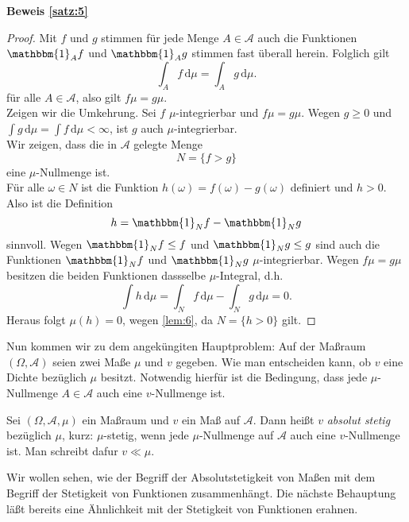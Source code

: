 \documentclass[/Users/zhangwusheng/Documents/satz von radon nikodym/satz von radon nikodym.tex]{subfiles}
\begin{document}
    \textbf{Beweis \cref{satz:5}}
    \begin{proof}
        Mit $f$ und $g$ stimmen für jede Menge $A \in \mathcal{A}$ auch die Funktionen 
        $\mathbbm{1}_{A} f$ und $\mathbbm{1}_{A} g$ stimmen fast überall herein. Folglich gilt 
        \[\int_A f\,\mathrm{d}\mu = \int_A g\,\mathrm{d}\mu.\]
        für alle $A \in \mathcal{A}$, also gilt $f\mu = g\mu$.\\
        Zeigen wir die Umkehrung. Sei $f$ $\mu$-integrierbar und $f\mu = g\mu$. Wegen $g \geq 0$ und 
        $\int g\,\mathrm{d}\mu = \int f\,\mathrm{d}\mu < \infty$, ist $g$ auch $\mu$-integrierbar.\\ 
        Wir zeigen, dass die in $\mathcal{A}$ gelegte Menge
        \[N = \{f > g\}\]
        eine $\mu$-Nullmenge ist.\\
        Für alle $\omega \in N$ ist die Funktion $h(\omega) = f(\omega) - g(\omega)$ definiert und $h > 0$. 
        Also ist die Definition 
        \[h= \mathbbm{1}_{N} f - \mathbbm{1}_N g\]
        sinnvoll. Wegen $\mathbbm{1}_N f \leq f$ und $\mathbbm{1}_N g\leq g$ sind auch die Funktionen 
        $\mathbbm{1}_N f$ und $\mathbbm{1}_N g$ $\mu$-integrierbar. Wegen $f\mu = g\mu$ besitzen die beiden Funktionen
        dassselbe $\mu$-Integral, d.h.
        \[\int h\,\mathrm{d}\mu = \int_{N} f\,\mathrm{d}\mu - \int_N g\,\mathrm{d}\mu = 0.\]
        Heraus folgt $\mu(h) = 0$, wegen \cref{lem:6}, da $N = \{h > 0\}$ gilt.  
    \end{proof}
    Nun kommen wir zu dem angeküngiten Hauptproblem: Auf der Maßraum $(\Omega, \mathcal{A})$ seien zwei Maße $\mu$ und $v$ 
    gegeben. Wie man entscheiden kann, ob $v$ eine Dichte bezüglich $\mu$ besitzt. Notwendig hierfür ist die Bedingung, 
    dass jede $\mu$-Nullmenge $A \in \mathcal{A}$ auch eine $v$-Nullmenge ist.
    
    \begin{mdframed}[style=mdfexample]
        \begin{definition}
            Sei $(\Omega, \mathcal{A}, \mu)$ ein Maßraum und $v$ ein Maß auf $\mathcal{A}$. Dann heißt $v$ \textit{absolut stetig} 
            bezüglich $\mu$, kurz: $\mu$-stetig, wenn jede $\mu$-Nullmenge auf $\mathcal{A}$ auch eine $v$-Nullmenge ist. Man schreibt dafur $v \ll \mu$.
        \end{definition}
    \end{mdframed}
    Wir wollen sehen, wie der Begriff der Absolutstetigkeit von Maßen mit dem Begriff der Stetigkeit von Funktionen zusammenhängt. 
    Die nächste Behauptung läßt bereits eine Ähnlichkeit mit der Stetigkeit von Funktionen erahnen. 
\end{document}
